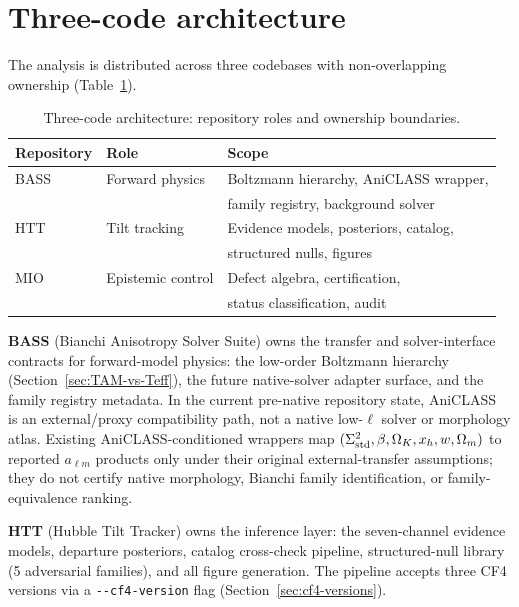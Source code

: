 \section{Three-code architecture}\label{sec:three-code}

The analysis is distributed across three codebases with
non-overlapping ownership (Table~\ref{tab:code-ownership}).

\begin{table}[t]
\caption{Three-code architecture: repository roles and
  ownership boundaries.}
\label{tab:code-ownership}
\centering\footnotesize
\setlength{\tabcolsep}{3pt}
\begin{tabular}{lll}
\hline\hline
Repository & Role & Scope \\
\hline
BASS & Forward physics &
  Boltzmann hierarchy, AniCLASS wrapper, \\
 & & family registry, background solver \\
HTT & Tilt tracking &
  Evidence models, posteriors, catalog, \\
 & & structured nulls, figures \\
MIO & Epistemic control &
  Defect algebra, certification, \\
 & & status classification, audit \\
\hline\hline
\end{tabular}
\end{table}

\noindent
\textbf{BASS} (Bianchi Anisotropy Solver Suite) owns the
transfer and solver-interface contracts for forward-model physics:
the low-order Boltzmann hierarchy
(Section~\ref{sec:TAM-vs-Teff}), the future native-solver adapter
surface, and the family registry metadata.  In the current pre-native
repository state, AniCLASS~\cite{Vicente2026} is an external/proxy
compatibility path, not a native low-\(\ell\) solver or morphology
atlas.  Existing AniCLASS-conditioned wrappers map
$(\Sigma^2_{\mathrm{std}}, \beta, \Omega_K, x_h, w, \Omega_m)$ to reported
$a_{\ell m}$ products only under their original external-transfer
assumptions; they do not certify native morphology, Bianchi family
identification, or family-equivalence ranking.

\textbf{HTT} (Hubble Tilt Tracker) owns the inference
layer: the seven-channel evidence models, departure
posteriors, catalog cross-check pipeline, structured-null
library (5 adversarial families), and all figure generation.
The pipeline accepts three CF4 versions via a
\texttt{-{}-cf4-version} flag (Section~\ref{sec:cf4-versions}).

